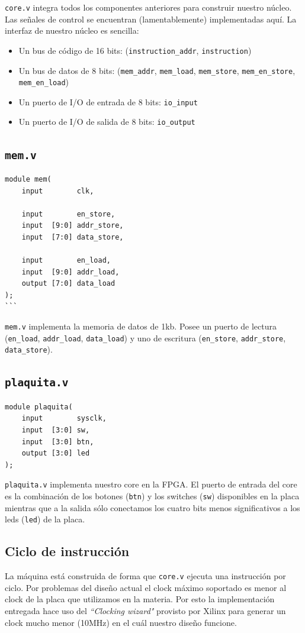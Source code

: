\documentclass{article}
\begin{document}
\texttt{core.v} integra todos los componentes anteriores para construir nuestro núcleo. Las señales de control se encuentran (lamentablemente) implementadas aquí. La interfaz de nuestro núcleo es sencilla:
\begin{itemize}
    \item Un bus de código de 16 bits: (\texttt{instruction\_addr}, \texttt{instruction})
    \item Un bus de datos de 8 bits: (\texttt{mem\_addr}, \texttt{mem\_load}, \texttt{mem\_store}, \texttt{mem\_en\_store}, \texttt{mem\_en\_load})
    \item Un puerto de I/O de entrada de 8 bits: \texttt{io\_input}
    \item Un puerto de I/O de salida de 8 bits: \texttt{io\_output}
\end{itemize}

\subsection{\texttt{mem.v}}
\begin{verbatim}
module mem(
    input        clk,

    input        en_store,
    input  [9:0] addr_store,
    input  [7:0] data_store,

    input        en_load,
    input  [9:0] addr_load,
    output [7:0] data_load
);
```
\end{verbatim}
\texttt{mem.v} implementa la memoria de datos de 1kb. Posee un puerto de lectura (\texttt{en\_load}, \texttt{addr\_load}, \texttt{data\_load}) y uno de escritura (\texttt{en\_store}, \texttt{addr\_store}, \texttt{data\_store}).

\subsection{\texttt{plaquita.v}}
\begin{verbatim}
module plaquita(
    input        sysclk,
    input  [3:0] sw,
    input  [3:0] btn,
    output [3:0] led
);
\end{verbatim}
\texttt{plaquita.v} implementa nuestro core en la FPGA. El puerto de entrada del core es la combinación de los botones (\texttt{btn}) y los switches (\texttt{sw}) disponibles en la placa mientras que a la salida sólo conectamos los cuatro bits menos significativos a los leds (\texttt{led}) de la placa.

\subsection{Ciclo de instrucción}
La máquina está construida de forma que \texttt{core.v} ejecuta una instrucción por ciclo. Por problemas del diseño actual el clock máximo soportado es menor al clock de la placa que utilizamos en la materia. Por esto la implementación entregada hace uso del \emph{``Clocking wizard"} provisto por Xilinx para generar un clock mucho menor (10MHz) en el cuál nuestro diseño funcione.
\end{document}
